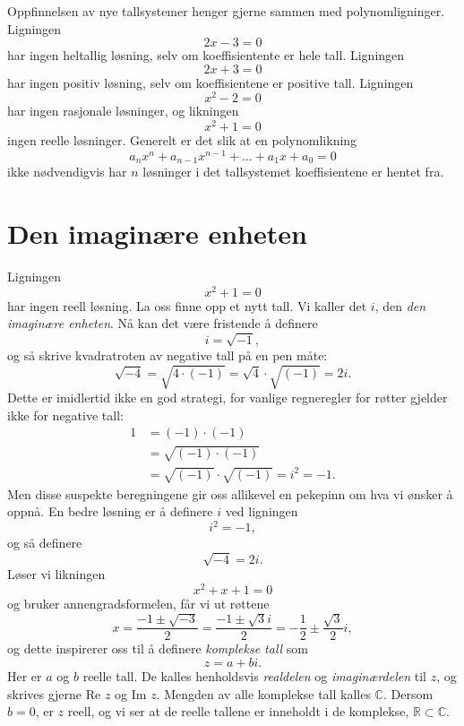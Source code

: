 

\label{ch:komplekse-tall}

Oppfinnelsen av nye tallsystemer henger gjerne sammen med polynomligninger. Ligningen
\[
2x-3=0
\]
har ingen heltallig løsning, selv om koeffisientente er hele tall. Ligningen 
\[
2x+3=0
\]
har ingen positiv løsning, selv om koeffisientene er positive tall. Ligningen
\[
x^2-2=0
\]
har ingen rasjonale løsninger, og likningen 
\[
x^2+1=0
\]
ingen reelle løsninger. 
Generelt er det slik at en polynomlikning
\[
a_nx^n+a_{n-1}x^{n-1}+...+a_1x+a_0=0
\]
ikke nødvendigvis har $n$ løsninger i det tallsystemet koeffisientene er hentet fra. 

\section*{Den imaginære enheten}
Ligningen
\[
x^2+1=0
\]
har ingen reell løsning. 
La oss finne opp et nytt tall. Vi kaller det $i$, den \emph{den imaginære enheten}. 
Nå kan det være fristende å definere
\[
i=\sqrt{-1},
\]
og så skrive kvadratroten av negative tall på en pen måte:
\begin{equation*}
\sqrt{-4}=\sqrt{4\cdot (-1)}=\sqrt{4}\cdot \sqrt{(-1)}=2i.
\end{equation*}
Dette er imidlertid ikke en god strategi,
for vanlige regneregler for røtter gjelder ikke for negative tall:
\begin{align*}
1&=(-1)\cdot(-1)\\&=\sqrt{(-1)\cdot (-1)}\\&=\sqrt{(-1)}\cdot \sqrt{ (-1)}=i^2=-1.
\end{align*}
Men disse suspekte beregningene gir oss allikevel en pekepinn om hva vi ønsker å oppnå. 
En bedre løsning er å definere $i$ ved ligningen
\[
i^2=-1,
\]
og så definere
\begin{equation*}
\sqrt{-4}=2i.
\end{equation*}
Løser vi likningen
\[
x^2+x+1=0
\]
og bruker annengradsformelen, får vi ut røttene
\[
x=\frac{-1\pm \sqrt{-3}}{2}=\frac{-1\pm \sqrt{3}i}{2}=-\frac{1}{2}\pm\frac{\sqrt{3}}{2}i,
\]
og dette inspirerer oss til å definere \emph{komplekse tall} som 
\[
z=a+bi.
\]
Her er $a$ og $b$ reelle tall. 
De kalles henholdsvis \emph{realdelen} og \emph{imaginærdelen} til $z$, og skrives gjerne Re $z$ og Im $z$. 
Mengden av alle komplekse tall kalles $\mathbb C$. 
Dersom $b=0$, er $z$ reell, og vi ser at de reelle tallene er inneholdt i de komplekse, $\mathbb R \subset \mathbb C$.


